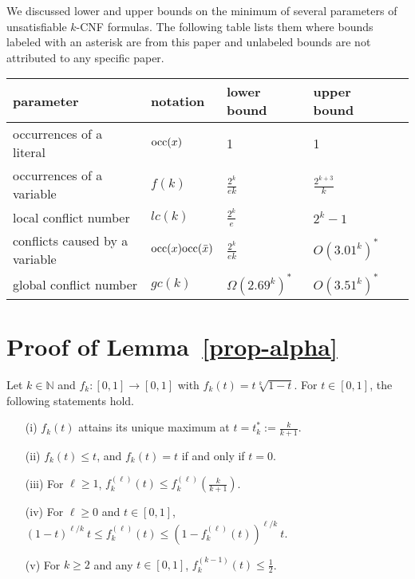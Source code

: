 \documentclass[a4paper, 11pt]{article}
\newcommand{\occ}{\ensuremath{{\rm{occ}}}}
\begin{document}
We discussed lower and upper bounds on the minimum of several parameters
of unsatisfiable $k$-CNF formulas. The following table lists them
where bounds labeled with an asterisk are from this paper and
unlabeled bounds are not attributed to any specific paper. 

\begin{table}[htbp]
  \centering
  \begin{tabular}{lllll}
    parameter & notation & lower bound & upper bound\\\hline
    occurrences of a literal & $\occ(x)$ & 1 & 1\\
    occurrences of a variable & $f(k)$ & 
    $\frac{2^k}{ek}$~\cite{KST1993} & $\frac{2^{k+3}}{k}$~\cite{Gebauer2009}\\
    local conflict number & $lc(k)$ & $\frac{2^k}{e}$~\cite{KST1993} & $2^k-1$\\
    conflicts caused by a variable \hspace{2mm} & $\occ(x)\occ(\bar{x})$ & 
    $\frac{2^k}{ek}$~\cite{KST1993} & $O(3.01^k)^*$\\
    global conflict number & $gc(k)$ & $\Omega(2.69^k)^*$ & $O(3.51^k)^*$
  \end{tabular}
\end{table}





\newpage
\appendix

\section{Proof of Lemma~\ref{prop-alpha}}

\begin{proposition}
  Let $k \in \mathbb{N}$ and $f_k : [0,1] \rightarrow [0,1]$ with $f_k(t)=t\sqrt[k]{1-t}$. For $t \in [0,1]$, the following statements hold.
  \begin{itemize}
    
  \item[(i)] $f_k(t)$ attains its unique maximum at
    $t = t^*_k := \frac{k}{k+1}$.
  \item[(ii)] $f_k(t) \leq t$, and $f_k(t)=t$ if and only if $t=0$.
  \item[(iii)] For $\ell \geq 1$, $f^{(\ell)}_k(t) \leq
    f^{(\ell)}_k\left(\frac{k}{k+1}\right)$.
  \item[(iv)] For $\ell \geq 0$ and $t \in [0,1]$,
    $(1-t)^{\ell / k}\ t \leq f_k^{(\ell)}(t) \leq
    (1-f_k^{(\ell)}(t))^{\ell/k}\ t$.
  \item[(v)] For $k\geq 2$ and any $t \in [0,1]$, $f_k^{(k-1)}(t)
    \leq \frac{1}{2}$.
  \end{itemize}
  \label{prop-ell}
\end{proposition}
\end{document}
